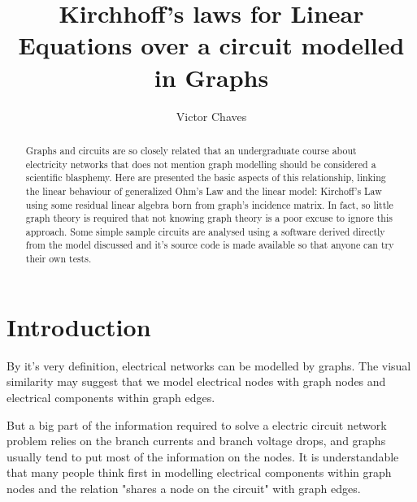 \documentclass{comjnl}
\begin{document}
\title[Kirchhoff's laws for Linear Equations over a circuit modelled in Graphs]{Kirchhoff's laws for Linear Equations over a circuit modelled in Graphs}
\author{Victor Chaves}
 






\begin{abstract}
Graphs and circuits are so closely related that an undergraduate course about electricity networks that does not mention graph modelling should be considered a scientific blasphemy. Here are presented the basic aspects of this relationship, linking the linear behaviour of generalized Ohm's Law and the linear model: Kirchoff's Law using some residual linear algebra born from graph's incidence matrix. In fact, so little graph theory is required that not knowing graph theory is a poor excuse to ignore this approach. Some simple sample circuits are analysed using a software derived directly from the model discussed and it's source code is made available so that anyone can try their own tests.
\end{abstract}

\maketitle


\section{Introduction}
\label{Sec:Intro}

By it's very definition, electrical networks can be modelled by graphs. The visual similarity may suggest that we model electrical nodes with graph nodes and electrical components within graph edges.

But a big part of the information required to solve a electric circuit network problem relies on the branch currents and branch voltage drops, and graphs usually tend to put most of the information on the nodes. It is understandable that many people think first in modelling electrical components within graph nodes and the relation "shares a node on the circuit" with graph edges.
\end{document}
